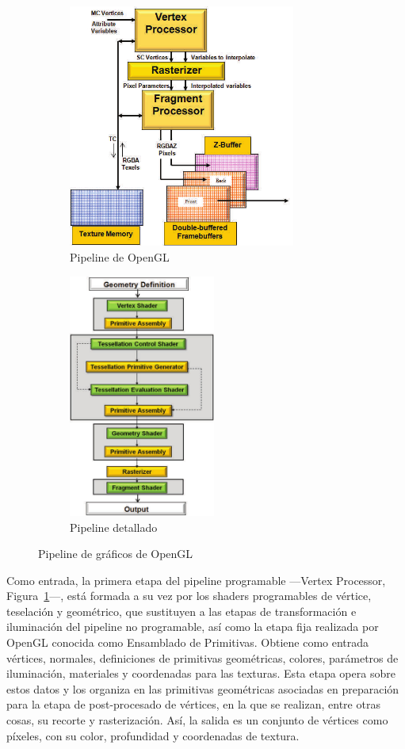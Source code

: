 \begin{figure}[h]%
	\begin{subfigure}[b]{.5\textwidth}
		\centering
		\includegraphics[height=8cm]{figures/pipeline.png}
		\caption{Pipeline de OpenGL}
		\label{fig2.2a}
	\end{subfigure}
	\begin{subfigure}[b]{.5\textwidth}
		\centering
		\includegraphics[height=8cm]{figures/pipelineExtendido.png}
		\caption{Pipeline detallado}
		\label{fig2.2b}
	\end{subfigure}
	\caption{Pipeline de gráficos de OpenGL}
	\label{fig2.2}
\end{figure}

Como entrada, la primera etapa del pipeline programable ---Vertex Processor,
Figura~\ref{fig2.2a}---, está formada a su vez por los shaders programables de
vértice, teselación y geométrico, que sustituyen a las etapas de transformación
e iluminación del pipeline no programable, así como la etapa fija realizada por
OpenGL conocida como Ensamblado de Primitivas. Obtiene como entrada vértices,
normales, definiciones de primitivas geométricas, colores, parámetros de
iluminación, materiales y coordenadas para las texturas. Esta etapa opera sobre
estos datos y los organiza en las primitivas geométricas asociadas en
preparación para la etapa de post-procesado de vértices, en la que se realizan,
entre otras cosas, su recorte y rasterización.  Así, la salida es un conjunto de
vértices como píxeles, con su color, profundidad y coordenadas de textura.\\

